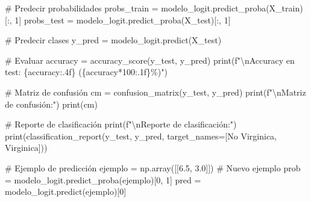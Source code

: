 \documentclass[
  doc,
  floatsintext,
  longtable,
  a4paper,
  nolmodern,
  notxfonts,
  notimes,
  12pt,
  colorlinks=true,linkcolor=blue,citecolor=blue,urlcolor=blue]{apa7}
\newenvironment{Shaded}{\begin{snugshade}}{\end{snugshade}}
\newcommand{\BuiltInTok}[1]{\textcolor[rgb]{0.00,0.23,0.31}{#1}}
\newcommand{\CharTok}[1]{\textcolor[rgb]{0.13,0.47,0.30}{#1}}
\newcommand{\CommentTok}[1]{\textcolor[rgb]{0.37,0.37,0.37}{#1}}
\newcommand{\DecValTok}[1]{\textcolor[rgb]{0.68,0.00,0.00}{#1}}
\newcommand{\FloatTok}[1]{\textcolor[rgb]{0.68,0.00,0.00}{#1}}
\newcommand{\NormalTok}[1]{\textcolor[rgb]{0.00,0.23,0.31}{#1}}
\newcommand{\OperatorTok}[1]{\textcolor[rgb]{0.37,0.37,0.37}{#1}}
\newcommand{\SpecialCharTok}[1]{\textcolor[rgb]{0.37,0.37,0.37}{#1}}
\newcommand{\SpecialStringTok}[1]{\textcolor[rgb]{0.13,0.47,0.30}{#1}}
\newcommand{\StringTok}[1]{\textcolor[rgb]{0.13,0.47,0.30}{#1}}
\begin{document}
\begin{Shaded}
\begin{Highlighting}[]
\CommentTok{\# Predecir probabilidades}
\NormalTok{probs\_train }\OperatorTok{=}\NormalTok{ modelo\_logit.predict\_proba(X\_train)[:, }\DecValTok{1}\NormalTok{]}
\NormalTok{probs\_test }\OperatorTok{=}\NormalTok{ modelo\_logit.predict\_proba(X\_test)[:, }\DecValTok{1}\NormalTok{]}

\CommentTok{\# Predecir clases}
\NormalTok{y\_pred }\OperatorTok{=}\NormalTok{ modelo\_logit.predict(X\_test)}

\CommentTok{\# Evaluar}
\NormalTok{accuracy }\OperatorTok{=}\NormalTok{ accuracy\_score(y\_test, y\_pred)}
\BuiltInTok{print}\NormalTok{(}\SpecialStringTok{f"}\CharTok{\textbackslash{}n}\SpecialStringTok{Accuracy en test: }\SpecialCharTok{\{}\NormalTok{accuracy}\SpecialCharTok{:.4f\}}\SpecialStringTok{ (}\SpecialCharTok{\{}\NormalTok{accuracy}\OperatorTok{*}\DecValTok{100}\SpecialCharTok{:.1f\}}\SpecialStringTok{\%)"}\NormalTok{)}

\CommentTok{\# Matriz de confusión}
\NormalTok{cm }\OperatorTok{=}\NormalTok{ confusion\_matrix(y\_test, y\_pred)}
\BuiltInTok{print}\NormalTok{(}\SpecialStringTok{f"}\CharTok{\textbackslash{}n}\SpecialStringTok{Matriz de confusión:"}\NormalTok{)}
\BuiltInTok{print}\NormalTok{(cm)}

\CommentTok{\# Reporte de clasificación}
\BuiltInTok{print}\NormalTok{(}\SpecialStringTok{f"}\CharTok{\textbackslash{}n}\SpecialStringTok{Reporte de clasificación:"}\NormalTok{)}
\BuiltInTok{print}\NormalTok{(classification\_report(y\_test, y\_pred, }
\NormalTok{                          target\_names}\OperatorTok{=}\NormalTok{[}\StringTok{\textquotesingle{}No Virginica\textquotesingle{}}\NormalTok{, }\StringTok{\textquotesingle{}Virginica\textquotesingle{}}\NormalTok{]))}

\CommentTok{\# Ejemplo de predicción}
\NormalTok{ejemplo }\OperatorTok{=}\NormalTok{ np.array([[}\FloatTok{6.5}\NormalTok{, }\FloatTok{3.0}\NormalTok{]])  }\CommentTok{\# Nuevo ejemplo}
\NormalTok{prob }\OperatorTok{=}\NormalTok{ modelo\_logit.predict\_proba(ejemplo)[}\DecValTok{0}\NormalTok{, }\DecValTok{1}\NormalTok{]}
\NormalTok{pred }\OperatorTok{=}\NormalTok{ modelo\_logit.predict(ejemplo)[}\DecValTok{0}\NormalTok{]}


\end{Highlighting}
\end{Shaded}
\end{document}
